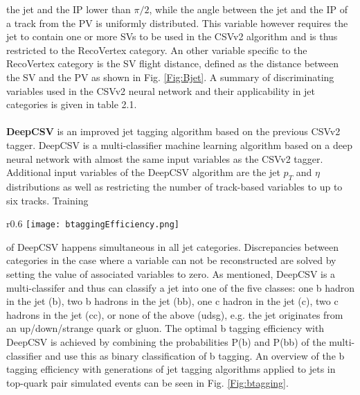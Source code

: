the jet and the IP lower than $\pi/2$, while the angle between
the jet and the IP of a track from the PV is uniformly distributed. This variable however requires the jet to contain one or more SVs to be used in the CSVv2 algorithm and is thus restricted to the RecoVertex category. An other variable specific to the RecoVertex category is the SV flight distance, defined as the distance between the SV and the PV as shown in Fig. \ref{Fig:Bjet}. A summary of discriminating variables used in the CSVv2 neural network and their applicability in jet categories is given in table 2.1.\\ 
\\
\textbf{DeepCSV}\cite{Sirunyan_2018} is an improved jet tagging algorithm based on the previous CSVv2 tagger. DeepCSV is a multi-classifier machine learning algorithm based on a deep neural network with almost the same input variables as the CSVv2 tagger. Additional input variables of the DeepCSV algorithm are the jet $p_T$ and $\eta$ distributions as well as restricting the number of track-based variables to up to six tracks. Training 
\begin{wrapfigure}{r}{0.6\textwidth}
    \texttt{[image: btaggingEfficiency.png]}
    \caption{Misidentification probability of b taggers for light jets (udsg) and c jets in terms of b jet efficiency\cite{Sirunyan_2018}}
    \label{Fig:btagging}
\end{wrapfigure} of DeepCSV happens simultaneous in all jet categories. Discrepancies between categories in the case where a variable can not be reconstructed are solved by setting the value of associated variables to zero. As mentioned, DeepCSV is a multi-classifer and thus can classify a jet into one of the five classes: one b hadron in the jet (b), two b hadrons in the jet (bb), one c hadron in the jet (c), two c hadrons in the jet (cc), or none of the above (udsg), e.g. the jet originates from an up/down/strange quark or gluon. The optimal b tagging efficiency with DeepCSV is achieved by combining the probabilities P(b) and P(bb) of the multi-classifier and use this as binary classification of b tagging. An overview of the b tagging efficiency with generations of jet tagging algorithms applied to jets in top-quark pair simulated events can be seen in Fig. \ref{Fig:btagging}.

